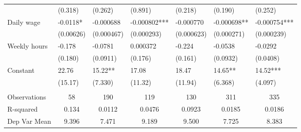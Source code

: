 \begin{tabular}{rrrrrrr}
\multicolumn{1}{l}{} & \multicolumn{1}{l}{(0.318)} & \multicolumn{1}{l}{(0.262)} & \multicolumn{1}{l}{(0.891)} & \multicolumn{1}{l}{(0.218)} & \multicolumn{1}{l}{(0.190)} & \multicolumn{1}{l}{(0.252)} \\
\multicolumn{1}{l}{Daily wage} & \multicolumn{1}{l}{-0.0118*} & \multicolumn{1}{l}{-0.000688} & \multicolumn{1}{l}{-0.000802***} & \multicolumn{1}{l}{-0.000770} & \multicolumn{1}{l}{-0.000698**} & \multicolumn{1}{l}{-0.000754***} \\
\multicolumn{1}{l}{} & \multicolumn{1}{l}{(0.00626)} & \multicolumn{1}{l}{(0.000467)} & \multicolumn{1}{l}{(0.000293)} & \multicolumn{1}{l}{(0.000623)} & \multicolumn{1}{l}{(0.000271)} & \multicolumn{1}{l}{(0.000239)} \\
\multicolumn{1}{l}{Weekly hours} & \multicolumn{1}{l}{-0.178} & \multicolumn{1}{l}{-0.0781} & \multicolumn{1}{l}{0.000372} & \multicolumn{1}{l}{-0.224} & \multicolumn{1}{l}{-0.0538} & \multicolumn{1}{l}{-0.0292} \\
\multicolumn{1}{l}{} & \multicolumn{1}{l}{(0.180)} & \multicolumn{1}{l}{(0.0911)} & \multicolumn{1}{l}{(0.176)} & \multicolumn{1}{l}{(0.161)} & \multicolumn{1}{l}{(0.0932)} & \multicolumn{1}{l}{(0.0408)} \\
\multicolumn{1}{l}{Constant} & \multicolumn{1}{l}{22.76} & \multicolumn{1}{l}{15.22**} & \multicolumn{1}{l}{17.08} & \multicolumn{1}{l}{18.47} & \multicolumn{1}{l}{14.65**} & \multicolumn{1}{l}{14.52***} \\
\multicolumn{1}{l}{} & \multicolumn{1}{l}{(15.17)} & \multicolumn{1}{l}{(7.330)} & \multicolumn{1}{l}{(11.32)} & \multicolumn{1}{l}{(11.94)} & \multicolumn{1}{l}{(6.368)} & \multicolumn{1}{l}{(4.097)} \\
\multicolumn{1}{l}{} & \multicolumn{1}{l}{} & \multicolumn{1}{l}{} & \multicolumn{1}{l}{} & \multicolumn{1}{l}{} & \multicolumn{1}{l}{} & \multicolumn{1}{l}{} \\
\midrule
\multicolumn{1}{l}{Observations} & \multicolumn{1}{c}{58} & \multicolumn{1}{c}{190} & \multicolumn{1}{c}{119} & \multicolumn{1}{c}{130} & \multicolumn{1}{c}{311} & \multicolumn{1}{c}{335} \\
\multicolumn{1}{l}{R-squared} & \multicolumn{1}{c}{0.134} & \multicolumn{1}{c}{0.0112} & \multicolumn{1}{c}{0.0476} & \multicolumn{1}{c}{0.0923} & \multicolumn{1}{c}{0.0185} & \multicolumn{1}{c}{0.0186} \\
\multicolumn{1}{l}{Dep Var Mean} & \multicolumn{1}{c}{9.396} & \multicolumn{1}{c}{7.471} & \multicolumn{1}{c}{9.189} & \multicolumn{1}{c}{9.500} & \multicolumn{1}{c}{7.725} & \multicolumn{1}{c}{8.383} \\

\end{tabular}
